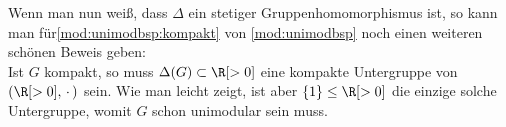 Wenn man nun weiß, dass $\Delta$ ein stetiger Gruppenhomomorphismus ist, so kann
man für\ref{mod:unimodbsp:kompakt} von \cref{mod:unimodbsp} noch einen weiteren
schönen Beweis geben:\\
Ist $G$ kompakt, so muss $\Delta(G)\subset\R[>0]$ eine kompakte Untergruppe von
$(\R[>0],\,\cdot\,)$ sein. Wie man leicht zeigt, ist aber $\{1\}\leq\R[>0]$ die
einzige solche Untergruppe, womit $G$ schon unimodular sein muss.


















